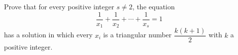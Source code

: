 Prove that for every positive integer $s\ne2$, the equation
\[\dfrac1{x_1}+\dfrac1{x_2}+\cdots+\dfrac1{x_s}=1\]
has a solution in which every $x_i$ is a triangular number $\dfrac{k(k+1)}{2}$ with $k$ a positive integer.
